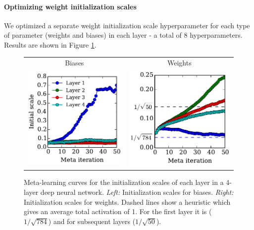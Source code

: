 \documentclass{article}
\begin{document}
\paragraph{Optimizing weight initialization scales}
We optimized a separate weight initialization scale hyperparameter for each type of parameter (weights and biases) in each layer - a total of 8 hyperparameters.
Results are shown in Figure \ref{fig:nn weight init scales}.
%
\begin{figure}[t]
\vskip 0.2in
\begin{center}
\begin{tabular}{cc}
 Biases & Weights \\
\hspace{-1em}\includegraphics[width=0.5\columnwidth, height=0.5\columnwidth]{../experiments/Feb_3_training_schedules/3_adam_50/init_bias_learning_curve.pdf} &
\hspace{-1em}\includegraphics[width=0.5\columnwidth, height=0.5\columnwidth]{../experiments/Feb_3_training_schedules/3_adam_50/init_weight_learning_curve.pdf}
\end{tabular}
\caption{Meta-learning curves for the initialization scales of each layer in a 4-layer deep neural network.
\emph{Left:} Initialization scales for biases.
\emph{Right:} Initialization scales for weights.
Dashed lines show a heuristic which gives an average total activation of 1.
For the first layer it is ($1/\sqrt{784}$) and for subsequent layers ($1/\sqrt{50}$).}
\label{fig:nn weight init scales}
\end{center}
\vskip -0.2in
\end{figure}
\end{document}
